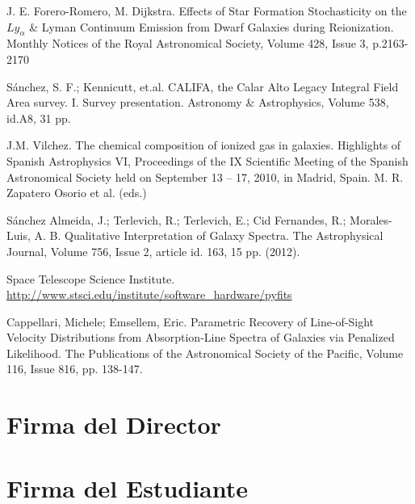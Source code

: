 \documentclass[12pt]{article}
\begin{document}
\begin{thebibliography}{10}

 J. E. Forero-Romero, M. Dijkstra. Effects of Star Formation Stochasticity on the $Ly_{\alpha}$ \&
Lyman Continuum Emission from Dwarf Galaxies during
Reionization. Monthly Notices of the Royal Astronomical Society, Volume 428, Issue 3, p.2163-2170

 S\'anchez, S. F.; Kennicutt, et.al. CALIFA, the
  Calar Alto Legacy Integral Field Area survey. I. Survey
  presentation. Astronomy \& Astrophysics, Volume 538, id.A8, 31 pp. 


 J.M. Vilchez. The chemical composition of ionized
  gas in galaxies. Highlights of Spanish Astrophysics VI, Proceedings
  of the IX Scientific Meeting of the Spanish Astronomical Society
  held on September 13 -- 17, 2010, in Madrid, Spain. M. R. Zapatero
  Osorio et al. (eds.) 

 S\'anchez Almeida, J.; Terlevich, R.; Terlevich, E.;
  Cid Fernandes, R.; Morales-Luis, A. B. Qualitative Interpretation of
  Galaxy Spectra. The Astrophysical Journal, Volume 756, Issue 2,
  article id. 163, 15 pp. (2012). 

 Space Telescope Science
  Institute. \url{http://www.stsci.edu/institute/software_hardware/pyfits} 

 Cappellari, Michele; Emsellem, Eric. Parametric
  Recovery of Line-of-Sight Velocity Distributions from
  Absorption-Line Spectra of Galaxies via Penalized Likelihood. The
  Publications of the Astronomical Society of the Pacific, Volume 116,
  Issue 816, pp. 138-147. 

\end{thebibliography}

\section*{Firma del Director}
\vspace{1.5cm}

\section*{Firma del Estudiante	}
\end{document}
